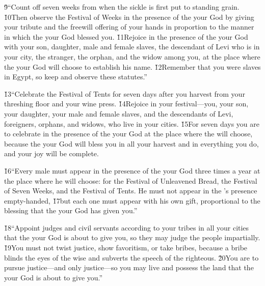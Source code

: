 \v{9}``Count off seven weeks from when the sickle is first put to standing grain. \v{10}Then observe the Festival of Weeks in the presence of the  your God by giving your tribute and the freewill offering of your hands in proportion to the manner in which the  your God blessed you. \v{11}Rejoice in the presence of the  your God with your son, daughter, male and female slaves, the descendant of Levi who is in your city, the stranger, the orphan, and the widow among you, at the place where the  your God will choose to establish his name. \v{12}Remember that you were slaves in Egypt, so keep and observe these statutes.''

\v{13}``Celebrate the Festival of Tents for seven days after you harvest from your threshing floor and your wine press. \v{14}Rejoice in your festival---you, your son, your daughter, your male and female slaves, and the descendants of Levi, foreigners, orphans, and widows, who live in your cities. \v{15}For seven days you are to celebrate in the presence of the  your God at the place where the  will choose, because the  your God will bless you in all your harvest and in everything you do, and your joy will be complete.

\v{16}``Every male must appear in the presence of the  your God three times a year at the place where he will choose: for the Festival of Unleavened Bread, the Festival of Seven Weeks, and the Festival of Tents. He must not appear in the 's presence empty-handed, \v{17}but each one must appear with his own gift, proportional to the blessing that the  your God has given you.''

\v{18}``Appoint judges and civil servants according to your tribes in all your cities that the  your God is about to give you, so they may judge the people impartially. \v{19}You must not twist justice, show favoritism, or take bribes, because a bribe blinds the eyes of the wise and subverts the speech of the righteous. \v{20}You are to pursue justice---and only justice---so you may live and possess the land that the  your God is about to give you.''

